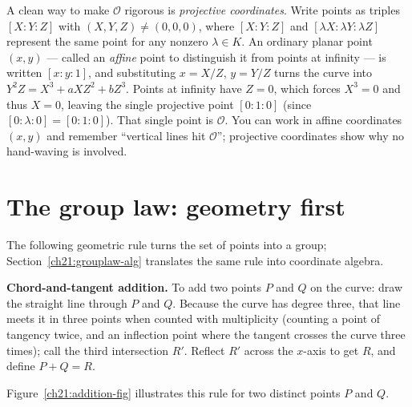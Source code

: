 \begin{focusbox}
A clean way to make $\mathcal{O}$ rigorous is \emph{projective coordinates}. Write
points as triples $[X:Y:Z]$ with $(X,Y,Z)\ne(0,0,0)$, where $[X:Y:Z]$ and
$[\lambda X:\lambda Y:\lambda Z]$ represent the same point for any nonzero $\lambda \in K$.
An ordinary planar point $(x,y)$ --- called an \emph{affine} point to distinguish it from
points at infinity --- is written $[x:y:1]$, and substituting $x = X/Z$, $y = Y/Z$ turns
the curve into $Y^2 Z = X^3 + aXZ^2 + bZ^3$. Points at infinity have $Z=0$, which forces
$X^3=0$ and thus $X=0$, leaving the single projective point $[0:1:0]$ (since $[0:\lambda:0]
= [0:1:0]$). That single point is $\mathcal{O}$. You can work in affine coordinates $(x,y)$
and remember ``vertical lines hit $\mathcal{O}$''; projective coordinates show why no
hand-waving is involved.
\end{focusbox}

\section{The group law: geometry first}
\label{ch21:grouplaw-geom}

The following geometric rule turns the set of points into a group; Section~\ref{ch21:grouplaw-alg}
translates the same rule into coordinate algebra.

\begin{focusbox}
\textbf{Chord-and-tangent addition.} To add two points $P$ and $Q$ on the curve:
draw the straight line through $P$ and $Q$. Because the curve has degree three, that line
meets it in three points when counted with multiplicity (counting a point of tangency
twice, and an inflection point where the tangent crosses the curve three times); call the
third intersection $R'$. Reflect $R'$ across the $x$-axis to get $R$, and define
$P + Q = R$.
\end{focusbox}

Figure~\ref{ch21:addition-fig} illustrates this rule for two distinct points $P$ and $Q$.

